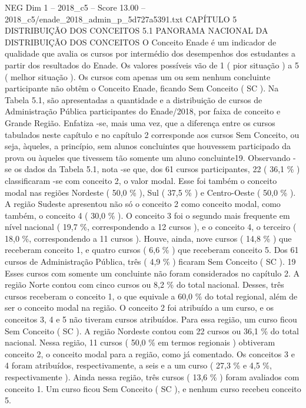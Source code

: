 \begin{textsample}{NEG Dim 1 – 2018\_c5 – Score 13.00 – 2018\_c5/enade\_2018\_admin\_p\_5d727a5391.txt}  \label{ex:f1_neg_372}
CAPÍTULO 5 DISTRIBUIÇÃO DOS CONCEITOS 5.1 PANORAMA NACIONAL DA DISTRIBUIÇÃO DOS CONCEITOS O Conceito Enade é um indicador de qualidade que avalia os cursos por intermédio dos desempenhos dos estudantes a partir dos resultados do Enade.
Os valores possíveis vão de 1 ( pior situação ) a 5 ( melhor situação ).
Os cursos com apenas um ou sem nenhum concluinte participante não obtêm o Conceito Enade, ficando Sem Conceito ( SC ).
Na Tabela 5.1, são apresentadas a quantidade e a distribuição de cursos de Administração Pública participantes do Enade/2018, por faixa de conceito e Grande Região.
Enfatiza -se, mais uma vez, que a diferença entre os cursos tabulados neste capítulo e no capítulo 2 corresponde aos cursos Sem Conceito, ou seja, àqueles, a princípio, sem alunos concluintes que houvessem participado da prova ou àqueles que tivessem tão somente um aluno concluinte19.
Observando -se os dados da Tabela 5.1, nota -se que, dos 61 cursos participantes, 22 ( 36,1 \% ) classificaram -se com conceito 2, o valor modal.
Esse foi também o conceito modal nas regiões Nordeste ( 50,0 \% ), Sul ( 37,5 \% ) e Centro-Oeste ( 50,0 \% ).
A região Sudeste apresentou não só o conceito 2 como conceito modal, como também, o conceito 4 ( 30,0 \% ).
O conceito 3 foi o segundo mais frequente em nível nacional ( 19,7 \%, correspondendo a 12 cursos ), e o conceito 4, o terceiro ( 18,0 \%, correspondendo a 11 cursos ).
Houve, ainda, nove cursos ( 14,8 \% ) que receberam conceito 1, e quatro cursos ( 6,6 \% ) que receberam conceito 5.
Dos 61 cursos de Administração Pública, três ( 4,9 \% ) ficaram Sem Conceito ( SC ). 19 Esses cursos com somente um concluinte não foram considerados no capítulo 2.
A região Norte contou com cinco cursos ou 8,2 \% do total nacional.
Desses, três cursos receberam o conceito 1, o que equivale a 60,0 \% do total regional, além de ser o conceito modal na região.
O conceito 2 foi atribuído a um curso, e os conceitos 3, 4 e 5 não tiveram cursos atribuídos.
Para essa região, um curso ficou Sem Conceito ( SC ).
A região Nordeste contou com 22 cursos ou 36,1 \% do total nacional.
Nessa região, 11 cursos ( 50,0 \% em termos regionais ) obtiveram conceito 2, o conceito modal para a região, como já comentado.
Os conceitos 3 e 4 foram atribuídos, respectivamente, a seis e a um curso ( 27,3 \% e 4,5 \%, respectivamente ).
Ainda nessa região, três cursos ( 13,6 \% ) foram avaliados com conceito 1.
Um curso ficou Sem Conceito ( SC ), e nenhum curso recebeu conceito 5.

\end{textsample}

